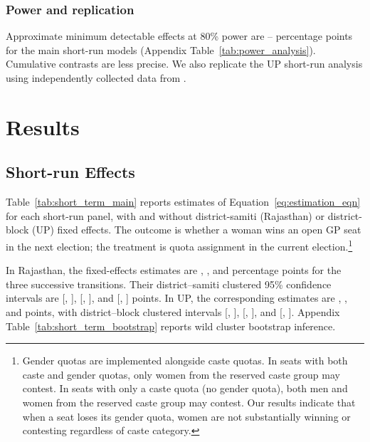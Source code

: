 \documentclass[12pt]{article}
\begin{document}
\subsubsection*{Power and replication}

Approximate minimum detectable effects at 80\% power are \shortMdeMin{}--\shortMdeMax{} percentage points for the main short-run models (Appendix Table~\ref{tab:power_analysis}). Cumulative contrasts are less precise. We also replicate the UP short-run analysis using independently collected data from \citet{weaver_data}.

\section{Results}\label{sec:results}

\subsection{Short-run Effects}

Table~\ref{tab:short_term_main} reports estimates of Equation~\ref{eq:estimation_eqn} for each short-run panel, with and without district-samiti (Rajasthan) or district-block (UP) fixed effects. The outcome is whether a woman wins an open GP seat in the next election; the treatment is quota assignment in the current election.\footnote{Gender quotas are implemented alongside caste quotas. In seats with both caste and gender quotas, only women from the reserved caste group may contest. In seats with only a caste quota (no gender quota), both men and women from the reserved caste group may contest. Our results indicate that when a seat loses its gender quota, women are not substantially winning or contesting regardless of caste category.}

In Rajasthan, the fixed-effects estimates are \rajShortOne{}, \rajShortTwo{}, and \rajShortThree{} percentage points for the three successive transitions. Their district--samiti clustered 95\% confidence intervals are [\rajShortOneLow{}, \rajShortOneHigh{}], [\rajShortTwoLow{}, \rajShortTwoHigh{}], and [\rajShortThreeLow{}, \rajShortThreeHigh{}] points. In UP, the corresponding estimates are \upShortOne{}, \upShortTwo{}, and \upShortThree{} points, with district--block clustered intervals [\upShortOneLow{}, \upShortOneHigh{}], [\upShortTwoLow{}, \upShortTwoHigh{}], and [\upShortThreeLow{}, \upShortThreeHigh{}]. Appendix Table~\ref{tab:short_term_bootstrap} reports wild cluster bootstrap inference.
\end{document}
